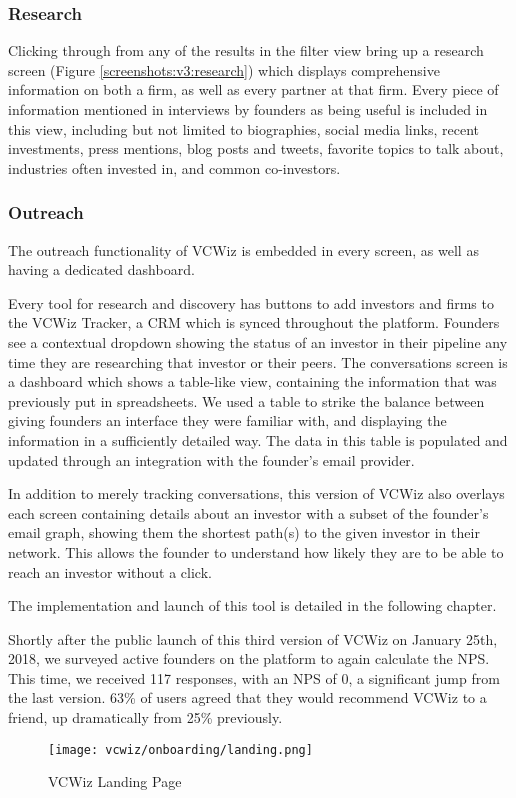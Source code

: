\subsubsection{Research}

Clicking through from any of the results in the filter view bring up a research screen (Figure \ref{screenshots:v3:research}) which displays comprehensive information on both a firm, as well as every partner at that firm. Every piece of information mentioned in interviews by founders as being useful is included in this view, including but not limited to biographies, social media links, recent investments, press mentions, blog posts and tweets, favorite topics to talk about, industries often invested in, and common co-investors.

\subsubsection{Outreach}

The outreach functionality of VCWiz is embedded in every screen, as well as having a dedicated dashboard.

Every tool for research and discovery has buttons to add investors and firms to the VCWiz Tracker, a CRM which is synced throughout the platform. Founders see a contextual dropdown showing the status of an investor in their pipeline any time they are researching that investor or their peers. The conversations screen is a dashboard which shows a table-like view, containing the information that was previously put in spreadsheets. We used a table to strike the balance between giving founders an interface they were familiar with, and displaying the information in a sufficiently detailed way. The data in this table is populated and updated through an integration with the founder's email provider.

In addition to merely tracking conversations, this version of VCWiz also overlays each screen containing details about an investor with a subset of the founder's email graph, showing them the shortest path(s) to the given investor in their network. This allows the founder to understand how likely they are to be able to reach an investor without a click.

The implementation and launch of this tool is detailed in the following chapter.

Shortly after the public launch of this third version of VCWiz on January 25th, 2018, we surveyed active founders on the platform to again calculate the NPS. This time, we received 117 responses, with an NPS of 0, a significant jump from the last version. 63\% of users agreed that they would recommend VCWiz to a friend, up dramatically from 25\% previously.

\begin{figure}[ht]
  \centering
  \texttt{[image: vcwiz/onboarding/landing.png]}
  \caption*{VCWiz Landing Page}
\end{figure}
